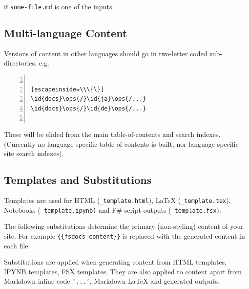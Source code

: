 \documentclass{article}
\newcommand{\id}[1]{\textcolor{black}{#1}}
\newcommand{\ops}[1]{\textcolor{purple}{#1}}
\begin{document}
if \texttt{some-file.md} is one of the inputs.
\subsection*{Multi-language Content}



Versions of content in other languages should go in two-letter coded sub-directories, e.g.
\begin{lstlisting}[numbers=left]

[escapeinside=\\\{\}]
\id{docs}\ops{/}\id{ja}\ops{/...}
\id{docs}\ops{/}\id{de}\ops{/...}


\end{lstlisting}



These will be elided from the main table-of-contents and search indexes.  (Currently no language-specific
table of contents is built, nor language-specific site search indexes).
\subsection*{Templates and Substitutions}



Templates are used for HTML (\texttt{\_template.html}), LaTeX (\texttt{\_template.tex}), Notebooks (\texttt{\_template.ipynb)}
and F\# script outputs (\texttt{\_template.fsx}).


The following substitutions determine the primary (non-styling) content of your site.
For example \texttt{\{\{fsdocs-content\}\}} is replaced with the generated content in each file.


Substitutions are applied when generating content from HTML templates, IPYNB templates, FSX templates.
They are also applied to content apart from Markdown inline code \texttt{`...`}, Markdown LaTeX and
generated outputs.
\end{document}
